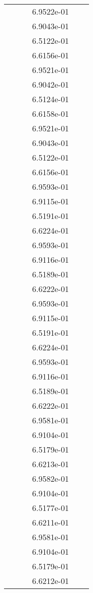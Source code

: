 \begin{xltabular}{\textwidth}{r|rS[table-format=1.3e+2]S[table-format=1.4e+2]S[table-format=1.4e+2]S[table-format=-1.5]}
&  &  & 6.9522e-01 & & \\
&  &  & 6.9043e-01 & & \\
&  &  & 6.5122e-01 & & \\
&  &  & 6.6156e-01 & & \\
&  &  & 6.9521e-01 & & \\
&  &  & 6.9042e-01 & & \\
&  &  & 6.5124e-01 & & \\
&  &  & 6.6158e-01 & & \\
&  &  & 6.9521e-01 & & \\
&  &  & 6.9043e-01 & & \\
&  &  & 6.5122e-01 & & \\
&  &  & 6.6156e-01 & & \\
&  &  & 6.9593e-01 & & \\
&  &  & 6.9115e-01 & & \\
&  &  & 6.5191e-01 & & \\
&  &  & 6.6224e-01 & & \\
&  &  & 6.9593e-01 & & \\
&  &  & 6.9116e-01 & & \\
&  &  & 6.5189e-01 & & \\
&  &  & 6.6222e-01 & & \\
&  &  & 6.9593e-01 & & \\
&  &  & 6.9115e-01 & & \\
&  &  & 6.5191e-01 & & \\
&  &  & 6.6224e-01 & & \\
&  &  & 6.9593e-01 & & \\
&  &  & 6.9116e-01 & & \\
&  &  & 6.5189e-01 & & \\
&  &  & 6.6222e-01 & & \\
&  &  & 6.9581e-01 & & \\
&  &  & 6.9104e-01 & & \\
&  &  & 6.5179e-01 & & \\
&  &  & 6.6213e-01 & & \\
&  &  & 6.9582e-01 & & \\
&  &  & 6.9104e-01 & & \\
&  &  & 6.5177e-01 & & \\
&  &  & 6.6211e-01 & & \\
&  &  & 6.9581e-01 & & \\
&  &  & 6.9104e-01 & & \\
&  &  & 6.5179e-01 & & \\
&  &  & 6.6212e-01 & & \\

\end{xltabular}
